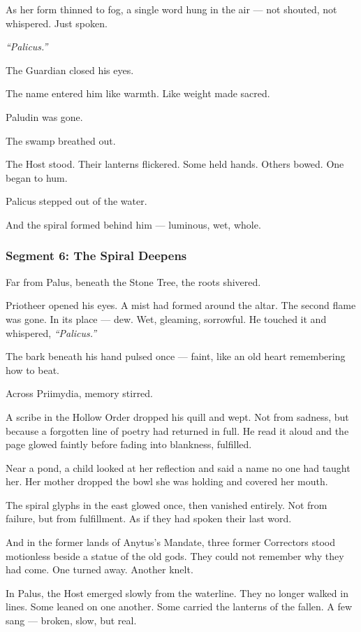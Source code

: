\documentclass[9pt]{article}
\begin{document}
As her form thinned to fog, a single word hung in the air — not shouted, not whispered. Just spoken.

\textit{``Palicus.''}

The Guardian closed his eyes.

The name entered him like warmth. Like weight made sacred.

Paludin was gone.

The swamp breathed out.

The Host stood. Their lanterns flickered. Some held hands. Others bowed. One began to hum.

Palicus stepped out of the water.

And the spiral formed behind him — luminous, wet, whole.

\newpage

\subsubsection*{Segment 6: The Spiral Deepens}

Far from Palus, beneath the Stone Tree, the roots shivered.

Priotheer opened his eyes. A mist had formed around the altar. The second flame was gone. In its place — dew. Wet, gleaming, sorrowful. He touched it and whispered, \textit{``Palicus.''}

The bark beneath his hand pulsed once — faint, like an old heart remembering how to beat.

Across Priimydia, memory stirred.

A scribe in the Hollow Order dropped his quill and wept. Not from sadness, but because a forgotten line of poetry had returned in full. He read it aloud and the page glowed faintly before fading into blankness, fulfilled.

Near a pond, a child looked at her reflection and said a name no one had taught her. Her mother dropped the bowl she was holding and covered her mouth.

The spiral glyphs in the east glowed once, then vanished entirely. Not from failure, but from fulfillment. As if they had spoken their last word.

And in the former lands of Anytus's Mandate, three former Correctors stood motionless beside a statue of the old gods. They could not remember why they had come. One turned away. Another knelt.

In Palus, the Host emerged slowly from the waterline. They no longer walked in lines. Some leaned on one another. Some carried the lanterns of the fallen. A few sang — broken, slow, but real.
\end{document}
